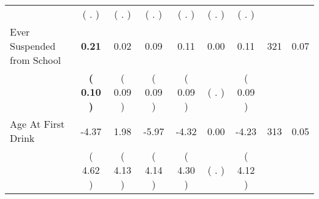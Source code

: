\begin{tabular}{lcccccccc}
 & (        . ) & (        . ) & (        . ) & (        . ) & (        . ) & (        . ) & \\
Ever Suspended from School & \textbf{     0.21} &      0.02 &      0.09 &      0.11 &      0.00 &      0.11 & 321 &       0.07 \\ 
 & \textbf{(     0.10 )} & (     0.09 ) & (     0.09 ) & (     0.09 ) & (        . ) & (     0.09 ) & \\
Age At First Drink &     -4.37 &      1.98 &     -5.97 &     -4.32 &      0.00 &     -4.23 & 313 &       0.05 \\ 
 & (     4.62 ) & (     4.13 ) & (     4.14 ) & (     4.30 ) & (        . ) & (     4.12 ) & \\
\bottomrule
\end{tabular}
